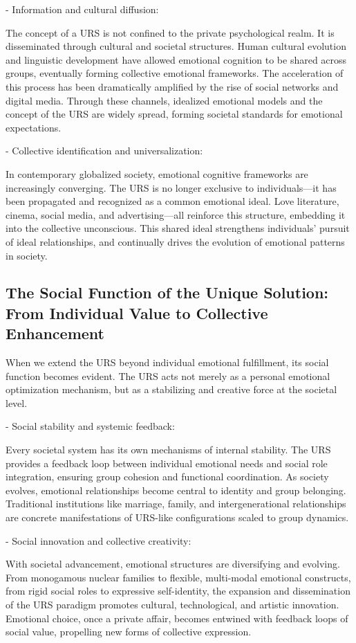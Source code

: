 \documentclass{article}
\begin{document}
- Information and cultural diffusion: 

The concept of a URS is not confined to the private psychological realm. It is disseminated through cultural and societal structures. Human cultural evolution and linguistic development have allowed emotional cognition to be shared across groups, eventually forming collective emotional frameworks. The acceleration of this process has been dramatically amplified by the rise of social networks and digital media. Through these channels, idealized emotional models and the concept of the URS are widely spread, forming societal standards for emotional expectations.

- Collective identification and universalization:

 In contemporary globalized society, emotional cognitive frameworks are increasingly converging. The URS is no longer exclusive to individuals—it has been propagated and recognized as a common emotional ideal. Love literature, cinema, social media, and advertising—all reinforce this structure, embedding it into the collective unconscious. This shared ideal strengthens individuals’ pursuit of ideal relationships, and continually drives the evolution of emotional patterns in society.

\subsection{The Social Function of the Unique Solution: From Individual Value to Collective Enhancement}

When we extend the URS beyond individual emotional fulfillment, its social function becomes evident. The URS acts not merely as a personal emotional optimization mechanism, but as a stabilizing and creative force at the societal level.

- Social stability and systemic feedback:

 Every societal system has its own mechanisms of internal stability. The URS provides a feedback loop between individual emotional needs and social role integration, ensuring group cohesion and functional coordination. As society evolves, emotional relationships become central to identity and group belonging. Traditional institutions like marriage, family, and intergenerational relationships are concrete manifestations of URS-like configurations scaled to group dynamics.

- Social innovation and collective creativity:

With societal advancement, emotional structures are diversifying and evolving. From monogamous nuclear families to flexible, multi-modal emotional constructs, from rigid social roles to expressive self-identity, the expansion and dissemination of the URS paradigm promotes cultural, technological, and artistic innovation. Emotional choice, once a private affair, becomes entwined with feedback loops of social value, propelling new forms of collective expression.
\end{document}
